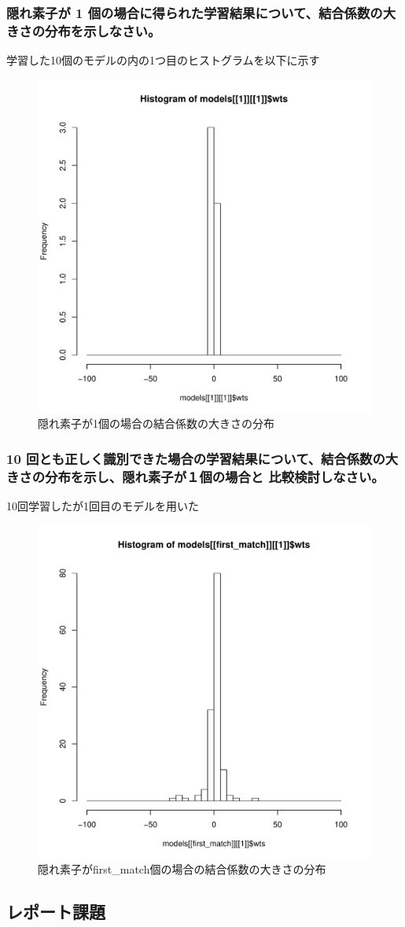 \documentclass{ltjsarticle}
\begin{document}
\subsubsection{隠れ素子が 1 個の場合に得られた学習結果について、結合係数の大きさの分布を示しなさい。}
学習した10個のモデルの内の1つ目のヒストグラムを以下に示す
\begin{figure}[H]
	\centering
	\includegraphics[width=0.5\hsize]{./fig1_3.pdf}
	\caption{隠れ素子が1個の場合の結合係数の大きさの分布}
	\label{fig1_3}
\end{figure}

\subsubsection{10 回とも正しく識別できた場合の学習結果について、結合係数の大きさの分布を示し、隠れ素子が１個の場合と 比較検討しなさい。}
10回学習したが1回目のモデルを用いた
\begin{figure}[H]
	\centering
	\includegraphics[width=0.5\hsize]{./fig1_4.pdf}
	\caption{隠れ素子がfirst\_match個の場合の結合係数の大きさの分布}
	\label{fig1_4}
\end{figure}


\subsection{レポート課題}
\end{document}
